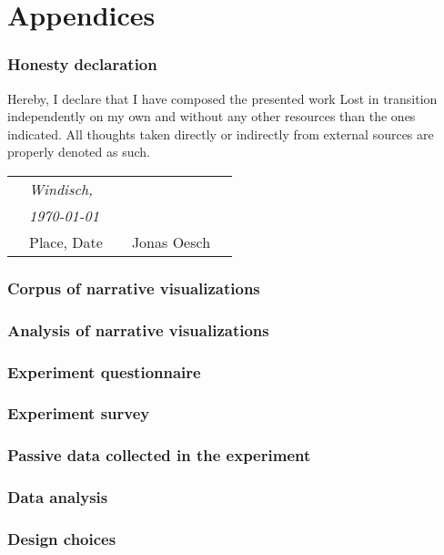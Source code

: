 \newpage
\appendix
\part{Appendices}

\section{Honesty declaration}
Hereby, I declare that I have composed the presented work Lost in transition independently on my own and without any other resources than the ones indicated. All thoughts taken directly or indirectly from external sources are properly denoted as such.
\vspace{3cm}

\centering
\begin{tabular}{p{10mm}>{\centering\arraybackslash}p{50mm}p{10mm}
>{\centering\arraybackslash}p{50mm}p{10mm}}
&\textit{\large Windisch,}&&& \\
&\textit{\large  \today}&&\hrulefill& \\
&\small Place, Date&&\small Jonas Oesch&
\end{tabular}

\newpage
\section{Corpus of narrative visualizations} \label{appendix-corpus}

\section{Analysis of narrative visualizations} \label{appendix-transition-analysis}

\section{Experiment questionnaire} \label{appendix-questionnaire}

\section{Experiment survey} \label{appendix-survey}

\section{Passive data collected in the experiment} \label{appendix-passivedata}

\section{Data analysis} \label{appendix-dataanalysis}

\section{Design choices} \label{appendix-designchoices}

